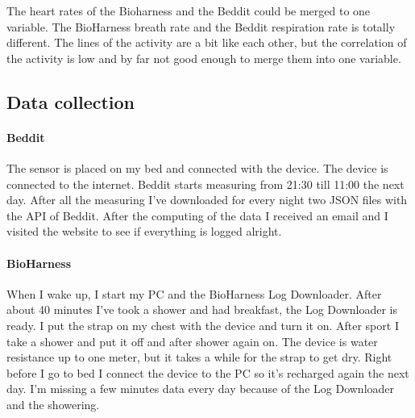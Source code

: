 			The heart rates of the Bioharness and the Beddit could be merged to one variable. The BioHarness breath rate and the Beddit respiration rate is totally different. The lines of the activity are a bit like each other, but the correlation of the activity is low and by far not good enough to merge them into one variable.

	\subsection{Data collection}
		\label{sec:datacollection}
		\paragraph{Beddit}
			The sensor is placed on my bed and connected with the device. The device is connected to the internet. Beddit starts measuring from 21:30 till 11:00 the next day. After all the measuring I've downloaded for every night two JSON files with the API of Beddit\cite{bedditapi}. After the computing of the data I received an email and I visited the website to see if everything is logged alright.
		\paragraph{BioHarness}
			When I wake up, I start my PC and the BioHarness Log Downloader. After about 40 minutes I've took a shower and had breakfast, the Log Downloader is ready. I put the strap on my chest with the device and turn it on. After sport I take a shower and put it off and after shower again on. The device is water resistance up to one meter, but it takes a while for the strap to get dry. Right before I go to bed I connect the device to the PC so it's recharged again the next day. I'm missing a few minutes data every day because of the Log Downloader and the showering. 
